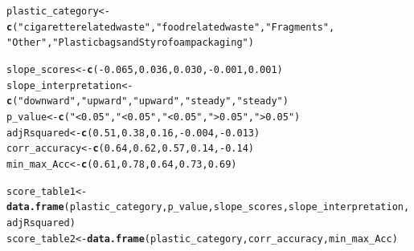 \documentclass[10pt]{article}\usepackage[]{graphicx}\usepackage[]{color}
\makeatletter
\newcommand{\hlnum}[1]{\textcolor[rgb]{0.686,0.059,0.569}{#1}}%
\newcommand{\hlstr}[1]{\textcolor[rgb]{0.192,0.494,0.8}{#1}}%
\newcommand{\hlopt}[1]{\textcolor[rgb]{0,0,0}{#1}}%
\newcommand{\hlstd}[1]{\textcolor[rgb]{0.345,0.345,0.345}{#1}}%
\newcommand{\hlkwb}[1]{\textcolor[rgb]{0.69,0.353,0.396}{#1}}%
\newcommand{\hlkwd}[1]{\textcolor[rgb]{0.737,0.353,0.396}{\textbf{#1}}}%
\newenvironment{kframe}{%
 \def\at@end@of@kframe{}%
 \ifinner\ifhmode%
  \def\at@end@of@kframe{\end{minipage}}%
  \begin{minipage}{\columnwidth}%
 \fi\fi%
 \def\FrameCommand##1{\hskip\@totalleftmargin \hskip-\fboxsep
 \colorbox{shadecolor}{##1}\hskip-\fboxsep
     \hskip-\linewidth \hskip-\@totalleftmargin \hskip\columnwidth}%
 \MakeFramed {\advance\hsize-\width
   \@totalleftmargin\z@ \linewidth\hsize
   \@setminipage}}%
 {\par\unskip\endMakeFramed%
 \at@end@of@kframe}
\newenvironment{knitrout}{}{} %
\makeatother
\begin{document}
\begin{knitrout}\small
{}\color{fgcolor}\begin{kframe}
\begin{alltt}
\hlstd{plastic_category} \hlkwb{<-}\hlkwd{c}\hlstd{(}\hlstr{"cigarette related waste"}\hlstd{,} \hlstr{"food related waste"}\hlstd{,}\hlstr{"Fragments"}\hlstd{,}
                      \hlstr{"Other"}\hlstd{,}\hlstr{"Plastic bags and Styrofoam packaging"} \hlstd{)}

\hlstd{slope_scores} \hlkwb{<-} \hlkwd{c}\hlstd{(}\hlopt{-}\hlnum{0.065}\hlstd{,}\hlnum{0.036}\hlstd{,} \hlnum{0.030}\hlstd{,} \hlopt{-}\hlnum{0.001}\hlstd{,} \hlnum{0.001}\hlstd{)}
\hlstd{slope_interpretation} \hlkwb{<-}\hlkwd{c}\hlstd{(}\hlstr{"downward"}\hlstd{,} \hlstr{"upward"}\hlstd{,} \hlstr{"upward"}\hlstd{,} \hlstr{"steady"}\hlstd{,} \hlstr{"steady"}\hlstd{)}
\hlstd{p_value}\hlkwb{<-}\hlkwd{c}\hlstd{(}\hlstr{"<0.05"}\hlstd{,}\hlstr{"<0.05"}\hlstd{,}\hlstr{"<0.05"}\hlstd{,} \hlstr{">0.05"}\hlstd{,}\hlstr{">0.05"}\hlstd{)}
\hlstd{adjRsquared} \hlkwb{<-} \hlkwd{c}\hlstd{(}\hlnum{0.51}\hlstd{,} \hlnum{0.38}\hlstd{,} \hlnum{0.16}\hlstd{,}  \hlopt{-}\hlnum{0.004}\hlstd{,} \hlopt{-}\hlnum{0.013}\hlstd{)}
\hlstd{corr_accuracy}\hlkwb{<-}\hlkwd{c}\hlstd{(}\hlnum{0.64}\hlstd{,} \hlnum{0.62}\hlstd{,} \hlnum{0.57}\hlstd{,} \hlnum{0.14}\hlstd{,}\hlopt{-}\hlnum{0.14}\hlstd{)}
\hlstd{min_max_Acc}\hlkwb{<-}\hlkwd{c}\hlstd{(}\hlnum{0.61}\hlstd{,}\hlnum{0.78}\hlstd{,}\hlnum{0.64}\hlstd{,} \hlnum{0.73} \hlstd{,}\hlnum{0.69}\hlstd{)}

\hlstd{score_table1} \hlkwb{<-} \hlkwd{data.frame}\hlstd{(plastic_category, p_value,slope_scores, slope_interpretation, adjRsquared)}
\hlstd{score_table2} \hlkwb{<-} \hlkwd{data.frame}\hlstd{(plastic_category, corr_accuracy, min_max_Acc)}
\end{alltt}
\end{kframe}
\end{knitrout}
\end{document}

